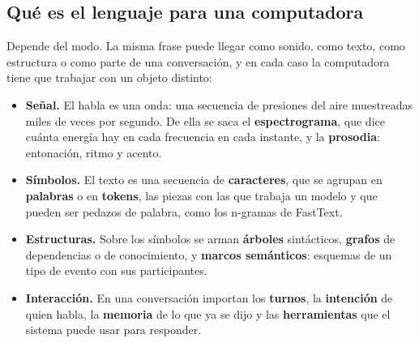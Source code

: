 \documentclass[11pt,letterpaper]{article}
\begin{document}
\subsection*{Qué es el lenguaje para una computadora}

Depende del modo. La misma frase puede llegar como sonido, como texto,
como estructura o como parte de una conversación, y en cada caso la
computadora tiene que trabajar con un objeto distinto:

\begin{itemize}[itemsep=0.3em]
    \item \textbf{Señal.} El habla es una onda: una secuencia de
          presiones del aire muestreadas miles de veces por segundo.
          De ella se saca el \textbf{espectrograma}, que dice cuánta
          energía hay en cada frecuencia en cada instante, y la
          \textbf{prosodia}: entonación, ritmo y acento.
    \item \textbf{Símbolos.} El texto es una secuencia de
          \textbf{caracteres}, que se agrupan en \textbf{palabras} o en
          \textbf{tokens}, las piezas con las que trabaja un modelo y
          que pueden ser pedazos de palabra, como los n-gramas de
          FastText.
    \item \textbf{Estructuras.} Sobre los símbolos se arman
          \textbf{árboles} sintácticos, \textbf{grafos} de dependencias
          o de conocimiento, y \textbf{marcos semánticos}: esquemas de
          un tipo de evento con sus participantes.
    \item \textbf{Interacción.} En una conversación importan los
          \textbf{turnos}, la \textbf{intención} de quien habla, la
          \textbf{memoria} de lo que ya se dijo y las
          \textbf{herramientas} que el sistema puede usar para
          responder.
\end{itemize}
\end{document}
